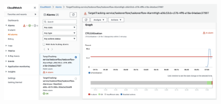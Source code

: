 \documentclass{csse4400}
\begin{document}
\begin{figure}[H]
  \begin{center}
    \includegraphics[width=\textwidth]{images/ecs3}
  \end{center}
\end{figure}



\end{document}
